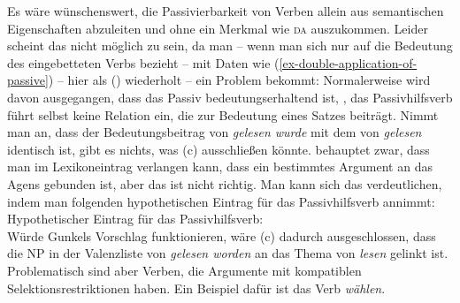 {Es wäre wünschenswert, die Passivierbarkeit von Verben allein aus semantischen Eigenschaften abzuleiten
und ohne ein Merkmal wie \textsc{da} auszukommen. Leider scheint das nicht möglich zu sein, 
da man -- wenn man sich nur auf die Bedeutung des eingebetteten
Verbs bezieht -- mit Daten wie (\ref{ex-double-application-of-passive}) -- hier als () wiederholt --
ein Problem bekommt: Normalerweise wird davon ausgegangen, dass das Passiv bedeutungserhaltend ist, 
\dash, das Passivhilfsverb führt selbst keine Relation ein, die zur Bedeutung eines Satzes beiträgt. 
\eal
\label{ex-double-application-of-passive-zwei}
\zl
Nimmt man an, dass der Bedeutungsbeitrag von \emph{gelesen wurde} mit dem von \emph{gelesen} identisch ist,
gibt es nichts, was (c) ausschließen könnte. \citet[--101]{Gunkel2003b} behauptet zwar, 
dass man im Lexikoneintrag verlangen kann, dass ein bestimmtes Argument an das Agens gebunden ist, aber
das ist nicht richtig. Man kann sich das verdeutlichen, indem man folgenden hypothetischen
Eintrag für das Passivhilfsverb annimmt:
\eas
\label{le-passiv-gunkel}%
Hypothetischer Eintrag für das Passivhilfsverb:\\
\zs
Würde Gunkels Vorschlag funktionieren, wäre (c) dadurch ausgeschlossen,
dass die NP in der Valenzliste von \emph{gelesen worden} an das Thema von \emph{lesen}
gelinkt ist. Problematisch sind aber Verben, die Argumente mit kompatiblen
Selektionsrestriktionen haben. Ein Beispiel dafür ist das Verb \emph{wählen}.
}
